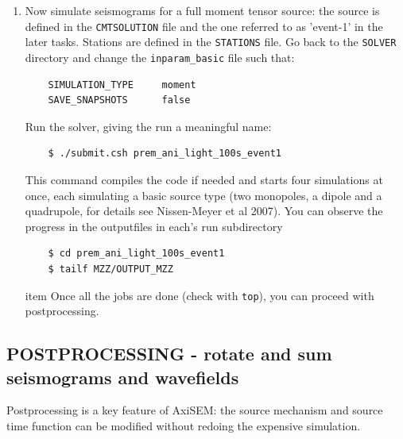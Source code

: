 \documentclass{article}
\begin{document}
\begin{enumerate}
    \item Now simulate seismograms for a full moment tensor source: the source is defined
    in the \verb|CMTSOLUTION| file and the one referred to as 'event-1' in the later tasks.
    Stations are defined in the \verb|STATIONS| file. Go back to the \verb|SOLVER|
    directory and change the \verb|inparam_basic| file such that:
    \begin{verbatim}
    SIMULATION_TYPE     moment
    SAVE_SNAPSHOTS      false
    \end{verbatim}
    Run the solver, giving the run a meaningful name:
    \begin{verbatim}
    $ ./submit.csh prem_ani_light_100s_event1
    \end{verbatim}
    This command compiles the code if needed and starts four simulations at once, each
    simulating a basic source type (two monopoles, a dipole and a quadrupole, for details
    see Nissen-Meyer et al 2007). You can observe the progress in the outputfiles in
    each's run subdirectory
    \begin{verbatim}
    $ cd prem_ani_light_100s_event1
    $ tailf MZZ/OUTPUT_MZZ
    \end{verbatim}
    item Once all the jobs are done (check with \verb|top|), you can proceed with
    postprocessing.
    
\end{enumerate}
    

\subsection{POSTPROCESSING - rotate and sum seismograms and wavefields}

Postprocessing is a key feature of AxiSEM: the source mechanism and source time function
can be modified without redoing the expensive simulation.
\end{document}
